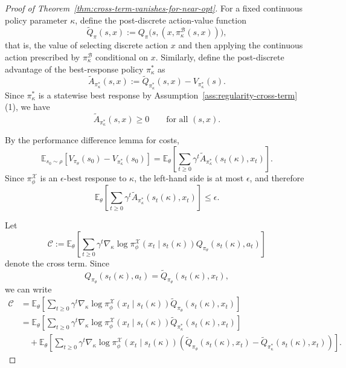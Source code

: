 \documentclass{article}
\theoremstyle{definition}
\theoremstyle{remark}
\begin{document}
\begin{proof}[Proof of Theorem~\ref{thm:cross-term-vanishes-for-near-opt}]

For a fixed continuous policy parameter $\kappa$, define the post-discrete
action-value function
\[
\tilde Q_{\pi}(s,x)
:=
Q_{\pi}\bigl(s,(x,\pi^{\mathcal B}_{\kappa}(s, x))\bigr),
\]
that is, the value of selecting discrete action $x$ and then applying the
continuous action prescribed by $\pi^{\mathcal B}_{\kappa}$ conditional on $x$. Similarly,
define the post-discrete advantage of the best-response policy $\pi^*_\kappa$ as
\[
\tilde A_{\pi^*_\kappa}(s,x)
:=
\tilde Q_{\pi^*_\kappa}(s,x)-V_{\pi^*_\kappa}(s).
\]
Since $\pi^*_\kappa$ is a statewise best response by
Assumption~\ref{ass:regularity-cross-term}(1), we have
\[
\tilde A_{\pi^*_\kappa}(s,x) \geq 0
\qquad \text{for all } (s,x).
\]

By the performance difference lemma for costs,
\[
\mathbb{E}_{s_0\sim \rho}
\!\left[
V_{\pi_\theta}(s_0)-V_{\pi^*_\kappa}(s_0)
\right]
=
\mathbb{E}_{\theta}\!\left[
\sum_{t\geq 0}\gamma^t
\tilde A_{\pi^*_\kappa}(s_t(\kappa),x_t)
\right].
\]
Since $\pi^{\mathcal X}_{\phi}$ is an $\epsilon$-best response to
$\kappa$, the left-hand side is at most $\epsilon$, and therefore
\begin{equation}
\label{eq:advantage-bound}
\mathbb{E}_{\theta}\!\left[
\sum_{t\geq 0}\gamma^t
\tilde A_{\pi^*_\kappa}(s_t(\kappa),x_t)
\right]
\leq \epsilon.
\end{equation}

Let
\[
\mathcal C
:=
\mathbb{E}_{\theta}\!\left[
\sum_{t\geq 0}
\gamma^t
\nabla_{\kappa}\log \pi^{\mathcal X}_{\phi}
\!\left(x_t\mid s_t(\kappa)\right)
Q_{\pi_\theta}(s_t(\kappa),a_t)
\right]
\]
denote the cross term. Since
\[
Q_{\pi_\theta}(s_t(\kappa),a_t)
=
\tilde Q_{\pi_\theta}(s_t(\kappa),x_t),
\]
we can write
\begin{align*}
\mathcal C
&=
\mathbb{E}_{\theta}\!\left[
\sum_{t\geq 0}\gamma^t
\nabla_{\kappa}\log \pi^{\mathcal X}_{\phi}
\!\left(x_t\mid s_t(\kappa)\right)
\tilde Q_{\pi_\theta}(s_t(\kappa),x_t)
\right] \\
&=
\mathbb{E}_{\theta}\!\left[
\sum_{t\geq 0}\gamma^t
\nabla_{\kappa}\log \pi^{\mathcal X}_{\phi}
\!\left(x_t\mid s_t(\kappa)\right)
\tilde Q_{\pi^*_\kappa}(s_t(\kappa),x_t)
\right] \\
&\quad+
\mathbb{E}_{\theta}\!\left[
\sum_{t\geq 0}\gamma^t
\nabla_{\kappa}\log \pi^{\mathcal X}_{\phi}
\!\left(x_t\mid s_t(\kappa)\right)
\left(
\tilde Q_{\pi_\theta}(s_t(\kappa),x_t)
-
\tilde Q_{\pi^*_\kappa}(s_t(\kappa),x_t)
\right)
\right].
\end{align*}


\end{proof}
\end{document}
